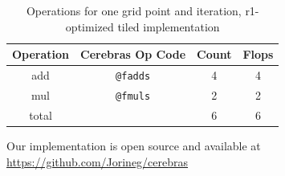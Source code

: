 \begin{table}[h]
    \centering
    \caption{Operations for one grid point and iteration, r1-optimized tiled implementation}
    \label{tab:tiled_operations_r1_optimized}
    \begin{tabular}{@{}cccc@{}}
        \toprule
        Operation & Cerebras Op Code & Count & Flops \\
        \midrule
        add & \texttt{@fadds} & \num{4} & \num{4} \\
        mul & \texttt{@fmuls} & \num{2} & \num{2} \\
        \midrule
        total & & \num{6} & \num{6} \\
        \bottomrule
    \end{tabular}
\end{table}

Our implementation is open source and available at \url{https://github.com/Jorineg/cerebras}